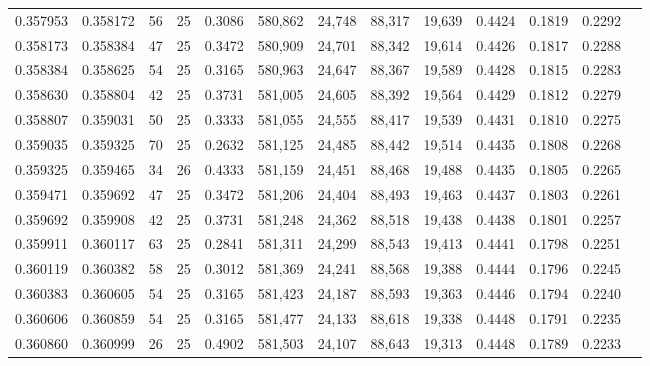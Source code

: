 \begin{tabular}{rrrrrrrrrrrrr}
0.357953 & 0.358172 &    56 &  25 &                                     0.3086 & 580,862 &  24,748 &  88,317 &  19,639 & 0.4424 & 0.1819 & 0.2292 \\
0.358173 & 0.358384 &    47 &  25 &                                     0.3472 & 580,909 &  24,701 &  88,342 &  19,614 & 0.4426 & 0.1817 & 0.2288 \\
0.358384 & 0.358625 &    54 &  25 &                                     0.3165 & 580,963 &  24,647 &  88,367 &  19,589 & 0.4428 & 0.1815 & 0.2283 \\
0.358630 & 0.358804 &    42 &  25 &                                     0.3731 & 581,005 &  24,605 &  88,392 &  19,564 & 0.4429 & 0.1812 & 0.2279 \\
0.358807 & 0.359031 &    50 &  25 &                                     0.3333 & 581,055 &  24,555 &  88,417 &  19,539 & 0.4431 & 0.1810 & 0.2275 \\
0.359035 & 0.359325 &    70 &  25 &                                     0.2632 & 581,125 &  24,485 &  88,442 &  19,514 & 0.4435 & 0.1808 & 0.2268 \\
0.359325 & 0.359465 &    34 &  26 &                                     0.4333 & 581,159 &  24,451 &  88,468 &  19,488 & 0.4435 & 0.1805 & 0.2265 \\
0.359471 & 0.359692 &    47 &  25 &                                     0.3472 & 581,206 &  24,404 &  88,493 &  19,463 & 0.4437 & 0.1803 & 0.2261 \\
0.359692 & 0.359908 &    42 &  25 &                                     0.3731 & 581,248 &  24,362 &  88,518 &  19,438 & 0.4438 & 0.1801 & 0.2257 \\
0.359911 & 0.360117 &    63 &  25 &                                     0.2841 & 581,311 &  24,299 &  88,543 &  19,413 & 0.4441 & 0.1798 & 0.2251 \\
0.360119 & 0.360382 &    58 &  25 &                                     0.3012 & 581,369 &  24,241 &  88,568 &  19,388 & 0.4444 & 0.1796 & 0.2245 \\
0.360383 & 0.360605 &    54 &  25 &                                     0.3165 & 581,423 &  24,187 &  88,593 &  19,363 & 0.4446 & 0.1794 & 0.2240 \\
0.360606 & 0.360859 &    54 &  25 &                                     0.3165 & 581,477 &  24,133 &  88,618 &  19,338 & 0.4448 & 0.1791 & 0.2235 \\
0.360860 & 0.360999 &    26 &  25 &                                     0.4902 & 581,503 &  24,107 &  88,643 &  19,313 & 0.4448 & 0.1789 & 0.2233 \\

\end{tabular}
